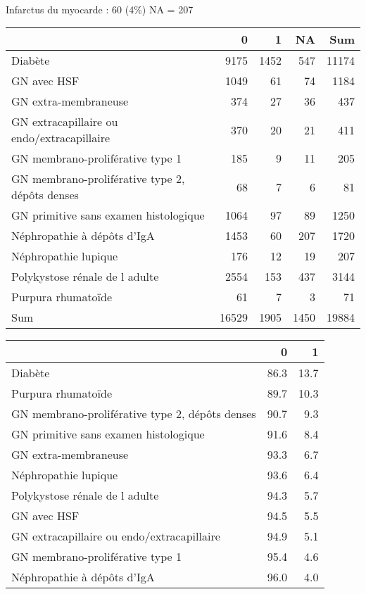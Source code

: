 \documentclass[11pt,a4paper]{article}\usepackage[]{graphicx}\usepackage[]{color}
\begin{document}
~\\

Infarctus du myocarde : 60 (4\%) NA = 207

\begin{table}[H]
\centering
\begin{tabular}{lrrrr}
  \hline
 & 0 & 1 & NA & Sum \\ 
  \hline
Diabète & 9175 & 1452 & 547 & 11174 \\ 
  GN avec HSF & 1049 & 61 & 74 & 1184 \\ 
  GN extra-membraneuse & 374 & 27 & 36 & 437 \\ 
  GN extracapillaire ou endo/extracapillaire & 370 & 20 & 21 & 411 \\ 
  GN membrano-proliférative type 1 & 185 & 9 & 11 & 205 \\ 
  GN membrano-proliférative type 2, dépôts denses & 68 & 7 & 6 & 81 \\ 
  GN primitive sans examen histologique & 1064 & 97 & 89 & 1250 \\ 
  Néphropathie à dépôts d'IgA & 1453 & 60 & 207 & 1720 \\ 
  Néphropathie lupique & 176 & 12 & 19 & 207 \\ 
  Polykystose rénale de l adulte & 2554 & 153 & 437 & 3144 \\ 
  Purpura rhumatoïde & 61 & 7 & 3 & 71 \\ 
  Sum & 16529 & 1905 & 1450 & 19884 \\ 
   \hline
\end{tabular}
\end{table}
\begin{table}[H]
\centering
\begin{tabular}{lrr}
  \hline
 & 0 & 1 \\ 
  \hline
Diabète & 86.3 & 13.7 \\ 
  Purpura rhumatoïde & 89.7 & 10.3 \\ 
  GN membrano-proliférative type 2, dépôts denses & 90.7 & 9.3 \\ 
  GN primitive sans examen histologique & 91.6 & 8.4 \\ 
  GN extra-membraneuse & 93.3 & 6.7 \\ 
  Néphropathie lupique & 93.6 & 6.4 \\ 
  Polykystose rénale de l adulte & 94.3 & 5.7 \\ 
  GN avec HSF & 94.5 & 5.5 \\ 
  GN extracapillaire ou endo/extracapillaire & 94.9 & 5.1 \\ 
  GN membrano-proliférative type 1 & 95.4 & 4.6 \\ 
  Néphropathie à dépôts d'IgA & 96.0 & 4.0 \\ 
   \hline
\end{tabular}
\end{table}
\end{document}
